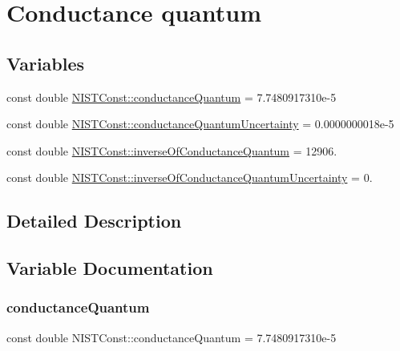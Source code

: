 \hypertarget{group___conductance_quantum}{}\section{Conductance quantum}
\label{group___conductance_quantum}
\subsection*{Variables}
\begin{DoxyCompactItemize}
\item 
const double \hyperlink{group___conductance_quantum_gac57088a56b37d0b899d3e9c9babaadaf}{N\+I\+S\+T\+Const\+::conductance\+Quantum} = 7.\+7480917310e-\/5
\item 
const double \hyperlink{group___conductance_quantum_ga599b808b8a742da1bb97cdb68f65cbf9}{N\+I\+S\+T\+Const\+::conductance\+Quantum\+Uncertainty} = 0.\+0000000018e-\/5
\item 
const double \hyperlink{group___conductance_quantum_ga39f726a47f146a434d7fca49fc2aeb30}{N\+I\+S\+T\+Const\+::inverse\+Of\+Conductance\+Quantum} = 12906.
\item 
const double \hyperlink{group___conductance_quantum_ga952c117f8b62615110f13d95c70075cd}{N\+I\+S\+T\+Const\+::inverse\+Of\+Conductance\+Quantum\+Uncertainty} = 0.
\end{DoxyCompactItemize}


\subsection{Detailed Description}


\subsection{Variable Documentation}
\mbox{\label{group___conductance_quantum_gac57088a56b37d0b899d3e9c9babaadaf}} 
\subsubsection{\texorpdfstring{conductance\+Quantum}{conductanceQuantum}}
{\footnotesize\ttfamily const double N\+I\+S\+T\+Const\+::conductance\+Quantum = 7.\+7480917310e-\/5}

